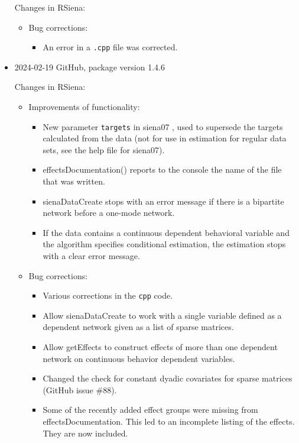 \documentclass[a4paper,fleqn,11pt]{article}
\newcommand{\+}{\, + \,}
\newcommand{\sfn}[1]{\textsf{#1}}
\begin{document}
\begin{small}
\begin{itemize}
Changes in RSiena:
\begin{itemize}
\item Bug corrections:
   \begin{itemize}
   \item An error in a \texttt{.cpp} file was corrected.
  \end{itemize}
\end{itemize}


\item 2024-02-19 GitHub, package version 1.4.6

Changes in RSiena:
\begin{itemize}
\item Improvements of functionality:
   \begin{itemize}
  \item New parameter \texttt{targets}  in \sfn{siena07} , used to supersede the targets
    calculated from the data (not for use in estimation for regular data sets,
    see the help file for \sfn{siena07}).
  \item \sfn{effectsDocumentation()}  reports to the console
    the name of the file that was written.
  \item \sfn{sienaDataCreate}  stops with an error message if there is a bipartite
    network before a one-mode network.
  \item If the data contains a continuous dependent behavioral variable and
    the algorithm specifies conditional estimation, the estimation stops
    with a clear error message.
    \end{itemize}
\item Bug corrections:
   \begin{itemize}
   \item Various corrections in the \texttt{cpp} code.
  \item Allow \sfn{sienaDataCreate}  to work with a single variable defined as
    a dependent network given as a list of sparse matrices.
  \item Allow \sfn{getEffects}  to construct effects of more than one dependent network
    on continuous behavior dependent variables.
  \item Changed the check for constant dyadic covariates for
  sparse matrices (GitHub issue \#88).
  \item Some of the recently added effect groups were missing from
    \sfn{effectsDocumentation}. This led to an incomplete listing of the effects.
    They are now included.
  \end{itemize}

\end{itemize}
\end{itemize}
\end{small}
\end{document}
